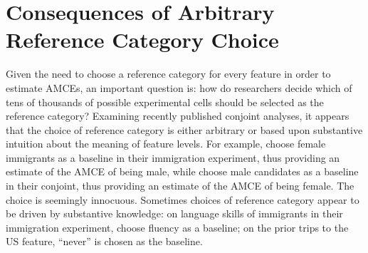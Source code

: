 \documentclass[a4paper,12pt]{article}\usepackage[]{graphicx}\usepackage[]{color}
\begin{document}


\section*{Consequences of Arbitrary Reference Category Choice}\label{sec:challenges}

Given the need to choose a reference category for every feature in order to estimate AMCEs, an important question is: how do researchers decide which of tens of thousands of possible experimental cells should be selected as the reference category? Examining recently published conjoint analyses, it appears that the choice of reference category is either arbitrary or based upon substantive intuition about the meaning of feature levels. For example, \citet{HainmuellerHopkinsYamamoto2014} choose female immigrants as a baseline in their immigration experiment, thus providing an estimate of the AMCE of being male, while \citet{TeeleKallaRosenbluth2018} choose male candidates as a baseline in their conjoint, thus providing an estimate of the AMCE of being female. The choice is seemingly innocuous. Sometimes choices of reference category appear to be driven by substantive knowledge: on language skills of immigrants in their immigration experiment, \citet{HainmuellerHopkinsYamamoto2014} choose fluency as a baseline; on the prior trips to the US feature, ``never'' is chosen as the baseline.
\end{document}
